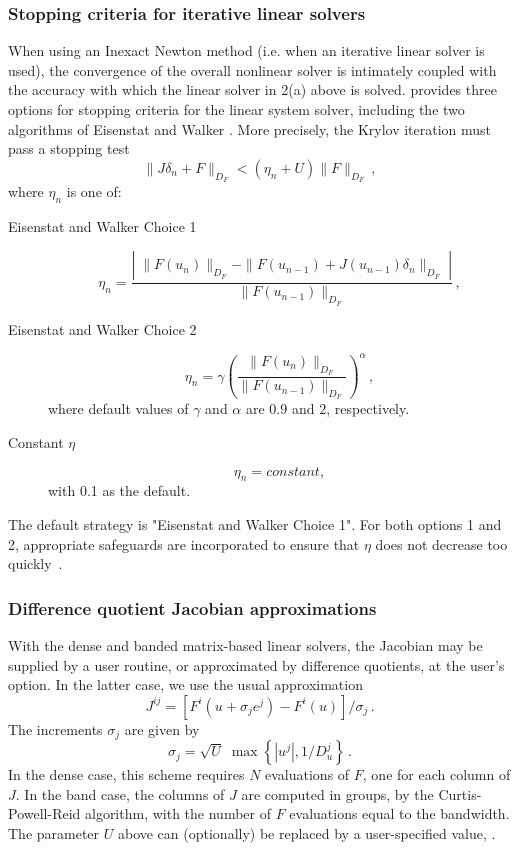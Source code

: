 \subsubsection*{Stopping criteria for iterative linear solvers}
\label{ss:InexactNewtonStopCrit}
When using an Inexact Newton method (i.e. when an iterative linear solver is
used), the convergence of the overall nonlinear solver is intimately coupled
with the accuracy with which the linear solver in 2(a) above is solved.
{\kinsol} provides three options for stopping criteria for the linear system
solver, including the two algorithms of Eisenstat and Walker \cite{EiWa:96}.
More precisely, the Krylov iteration must pass a stopping test
\[ \|J \delta_n + F\|_{D_F} < (\eta_n + U) \|F\|_{D_F} \, , \]
where $\eta_n$ is one of:
\begin{description}
\item[Eisenstat and Walker Choice 1]
  \[
  \eta_n = \frac{\left|\; \|F(u_n)\|_{D_F}
      - \|F(u_{n-1}) + J(u_{n-1}) \delta_n \|_{D_F}
      \; \right|}
  {\|F(u_{n-1})\|_{D_F}} \, ,
  \]
\item[Eisenstat and Walker Choice 2]
  \[
  \eta_n = \gamma
  \left( \frac{ \|F(u_n)\|_{D_F}}{\|F(u_{n-1})\|_{D_F}} \right)^{\alpha} \, ,
  \]
where default values of $\gamma$ and $\alpha$ are $0.9$ and $2$,
respectively.
\item[Constant $\eta$]
  \[
  \eta_n = constant,
  \]
with 0.1 as the default.
\end{description}
The default strategy is "Eisenstat and Walker Choice 1".
For both options 1 and 2, appropriate safeguards are incorporated to ensure that
$\eta$ does not decrease too quickly~\cite{EiWa:96}.


\subsubsection*{Difference quotient Jacobian approximations}
With the dense and banded matrix-based linear solvers, the Jacobian
may be supplied by a user routine, or approximated by difference
quotients, at the user's option.  In the latter case, we use the usual
approximation
\begin{equation}\label{e:JacDQ}
  J^{ij} = [F^i(u+\sigma_j e^j) - F^i(u)]/\sigma_j \, .
\end{equation}
The increments $\sigma_j$ are given by
\begin{equation}\label{e:sigmaDQ_direct}
  \sigma_j = \sqrt{U} \; \max\left\{ |u^j| , 1/D_u^j \right\} \, .
\end{equation}
In the dense case, this scheme requires $N$ evaluations of $F$,
one for each column of $J$.  In the band case, the columns of
$J$ are computed in groups, by the Curtis-Powell-Reid algorithm,
with the number of $F$ evaluations equal to the bandwidth.
The parameter $U$ above can (optionally) be replaced by a
user-specified value, .

